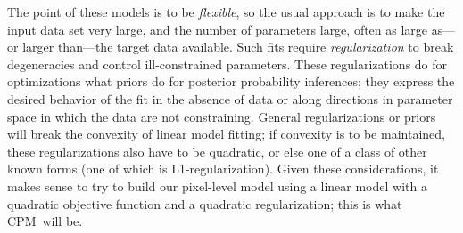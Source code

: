 \documentclass[12pt, preprint]{aastex}
\newcommand{\name}{CPM}
\begin{document}
The point of these models is to be \emph{flexible},
  so the usual approach is to make the input data set very large,
  and the number of parameters large,
  often as large as---or larger than---the target data available.
Such fits require \emph{regularization} to break degeneracies
  and control ill-constrained parameters.
These regularizations do for optimizations what priors do for posterior probability inferences;
  they express the desired behavior of the fit in the absence of data
  or along directions in parameter space in which the data are not constraining.
General regularizations or priors will break the convexity of linear model fitting;
  if convexity is to be maintained, these regularizations also have to be quadratic,
  or else one of a class of other known forms (one of which is L1-regularization).
Given these considerations, it makes sense to try to build our pixel-level model
  using a linear model with a quadratic objective function and a quadratic regularization;
  this is what \name\ will be.
\end{document}
